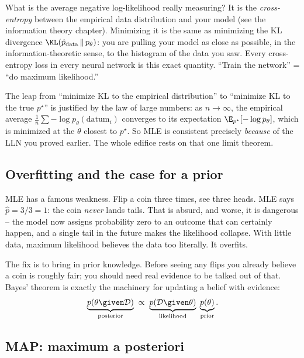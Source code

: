 \begin{happeningbox}
What is the average negative log-likelihood really measuring? It is the
\emph{cross-entropy} between the empirical data distribution and your model (see
the information theory chapter). Minimizing it is the same as minimizing the KL
divergence $\KL(\hat p_{\text{data}} \,\|\, p_\theta)$: you are pulling your
model as close as possible, in the information-theoretic sense, to the histogram
of the data you saw. Every cross-entropy loss in every neural network is this
exact quantity. ``Train the network'' = ``do maximum likelihood.''
\end{happeningbox}

\begin{connectionbox}
The leap from ``minimize KL to the empirical distribution'' to ``minimize KL to
the true $p^\star$'' is justified by the law of large numbers: as $n\to\infty$,
the empirical average $\frac1n\sum -\log p_\theta(\text{datum}_i)$ converges to
its expectation $\E_{p^\star}[-\log p_\theta]$, which is minimized at the
$\theta$ closest to $p^\star$. So MLE is consistent precisely \emph{because} of
the LLN you proved earlier. The whole edifice rests on that one limit theorem.
\end{connectionbox}

\subsection{Overfitting and the case for a prior}

MLE has a famous weakness. Flip a coin three times, see three heads. MLE says
$\hat p = 3/3 = 1$: the coin \emph{never} lands tails. That is absurd, and worse,
it is dangerous -- the model now assigns probability zero to an outcome that can
certainly happen, and a single tail in the future makes the likelihood collapse.
With little data, maximum likelihood believes the data too literally. It
overfits.

The fix is to bring in prior knowledge. Before seeing any flips you already
believe a coin is roughly fair; you should need real evidence to be talked out of
that. Bayes' theorem is exactly the machinery for updating a belief with
evidence:
\[
  \underbrace{p(\theta\given\mathcal{D})}_{\text{posterior}}
  \;\propto\;
  \underbrace{p(\mathcal{D}\given\theta)}_{\text{likelihood}}\;
  \underbrace{p(\theta)}_{\text{prior}}.
\]

\subsection{MAP: maximum a posteriori}

